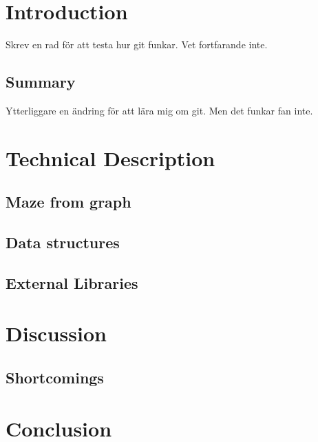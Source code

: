 \documentclass[12pt, a4paper]{article}
\begin{document}
\maketitle

\newpage


\tableofcontents


\newpage
\section{Introduction}
Skrev en rad för att testa hur git funkar. Vet fortfarande inte.
\subsection{Summary}
Ytterliggare en ändring för att lära mig om git. Men det funkar fan inte.   
\newpage
\section{Technical Description}
\subsection{Maze from graph}
\subsection{Data structures}



\subsection{External Libraries}



\newpage
\section{Discussion}
\subsection{Shortcomings}



\newpage
\section{Conclusion}
\end{document}
